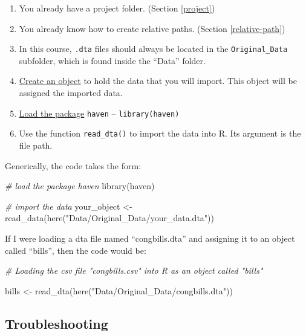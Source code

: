 \documentclass[
]{book}
\newenvironment{Shaded}{\begin{snugshade}}{\end{snugshade}}
\newcommand{\CommentTok}[1]{\textcolor[rgb]{0.56,0.35,0.01}{\textit{#1}}}
\newcommand{\FunctionTok}[1]{\textcolor[rgb]{0.00,0.00,0.00}{#1}}
\newcommand{\NormalTok}[1]{#1}
\newcommand{\OtherTok}[1]{\textcolor[rgb]{0.56,0.35,0.01}{#1}}
\newcommand{\StringTok}[1]{\textcolor[rgb]{0.31,0.60,0.02}{#1}}
\providecommand{\tightlist}{%
  \setlength{\itemsep}{0pt}\setlength{\parskip}{0pt}}
\begin{document}
\begin{enumerate}
\def\labelenumi{\arabic{enumi}.}
\tightlist
\item
  You already have a project folder. (Section \ref{project})
\item
  You already know how to create relative paths. (Section \ref{relative-path})
\item
  In this course, \texttt{.dta} files should always be located in the \texttt{Original\_Data} subfolder, which is found inside the ``Data'' folder.
\item
  \protect\hyperlink{object}{Create an object} to hold the data that you will import. This object will be assigned the imported data.
\item
  \protect\hyperlink{loadpack}{Load the package} \texttt{haven} -- \texttt{library(haven)}
\item
  Use the function \texttt{read\_dta()} to import the data into R. Its argument is the file path.
\end{enumerate}

Generically, the code takes the form:

\begin{Shaded}
\begin{Highlighting}[]
\CommentTok{\# load the package \textquotesingle{}haven\textquotesingle{}}
\FunctionTok{library}\NormalTok{(haven)}

\CommentTok{\# import the data}
\NormalTok{your\_object }\OtherTok{\textless{}{-}} \FunctionTok{read\_data}\NormalTok{(}\FunctionTok{here}\NormalTok{(}\StringTok{"Data/Original\_Data/your\_data.dta"}\NormalTok{))}
\end{Highlighting}
\end{Shaded}

If I were loading a dta file named ``congbills.dta'' and assigning it to an object called ``bills'', then the code would be:

\begin{Shaded}
\begin{Highlighting}[]
\CommentTok{\# Loading the csv file "congbills.csv" into R as an object called "bills"}

\NormalTok{bills }\OtherTok{\textless{}{-}} \FunctionTok{read\_dta}\NormalTok{(}\FunctionTok{here}\NormalTok{(}\StringTok{"Data/Original\_Data/congbills.dta"}\NormalTok{))}
\end{Highlighting}
\end{Shaded}

\hypertarget{troubleshooting-8}{%
\subsection{Troubleshooting}\label{troubleshooting-8}}
\end{document}
